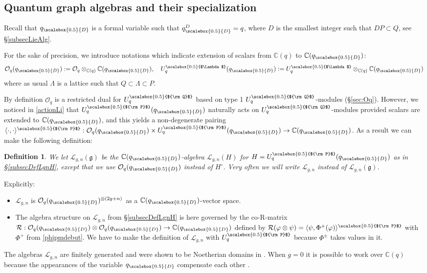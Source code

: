 \documentclass[11pt]{amsart}
\newtheorem{defi}[teo]{Definition}
\newcommand{\mc}{\mathbb{C}}
\newcommand{\Oo}{\mathcal{O}}
\newcommand{\qD}{q_{\scalebox{0.5}{D}}}
\newcommand{\Q}{{\scalebox{0.5}{${\rm Q}$}}}
\newcommand{\Pup}{{\scalebox{0.5}{${\rm P}$}}}
\newcommand{\Lam}{{\scalebox{0.5}{$\Lambda$}}}
\begin{document}
\subsection{Quantum graph algebras and their specialization}\label{subsecQuantumGraphAlg}
Recall that $\qD$ is a formal variable such that $\qD^D = q$, where $D$ is the smallest integer such that $DP \subset Q$, see \S\ref{subsecLieAlg}.

\indent For the sake of precision, we introduce notations which indicate extension of scalars from $\mathbb{C}(q)$ to $\mathbb{C}(\qD)$:
\[ \Oo_q(\qD) := \Oo_q \otimes_{\mc(q)} \mc(\qD), \quad U_q^\Lam(\qD) :=U_q^\Lam \otimes_{\mc(q)} \mc(\qD) \]
where as usual $\Lambda$ is a lattice such that $Q \subset \Lambda \subset P$.

\indent By definition $\mathcal{O}_q$ is a restricted dual for $U_q^\Q$ based on type 1 $U_q^\Q$-modules (\S\ref{sec:Oq}). However, we noticed in \eqref{actionLi} that $U_q^\Pup(\qD)$ naturally acts on $U_q^\Q$-modules provided scalars are extended to $\mathbb{C}(\qD)$, and this yields a non-degenerate pairing $\langle \cdot,\cdot\rangle^\Pup : \mathcal{O}_q(\qD) \times U^\Pup_q(\qD) \to \mathbb{C}(\qD)$. As a result we can make the following definition:

\begin{defi}
We let $\mathcal{L}_{g,n}(\mathfrak{g})$ be the $\mathbb{C}(\qD)$-algebra $\mathcal{L}_{g,n}(H)$ for $H = U_q^\Pup(\qD)$ as in \S\ref{subsecDefLgnH}, except that we use $\mathcal{O}_q(\qD)$ instead of $H^\circ$. Very often we will write $\mathcal{L}_{g,n}$ instead of $\mathcal{L}_{g,n}(\mathfrak{g})$.
\end{defi}
\noindent Explicitly:
\begin{itemize}
\item $\mathcal{L}_{g,n}$ is $\mathcal{O}_q(\qD)^{\otimes (2g+n)}$ as a $\mathbb{C}(\qD)$-vector space.
\item The algebra structure on $\mathcal{L}_{g,n}$ from \S\ref{subsecDefLgnH} is here governed by the co-R-matrix $\mathcal{R} : \mathcal{O}_q(\qD) \otimes \mathcal{O}_q(\qD) \to \mathbb{C}(\qD)$ defined by $\mathcal{R}(\varphi \otimes \psi) = \langle \psi, \Phi^+(\varphi) \rangle^\Pup$ with $\Phi^+$ from \eqref{phipmdebut}. We have to make the definition of $\mathcal{L}_{g,n}$ with $U_q^\Pup$ because $\Phi^\pm$ takes values in it.
\end{itemize}
 The algebras $\mathcal{L}_{g,n}$ are finitely generated and were shown to be Noetherian domains in \cite{BFR}. When $g=0$ it is possible to work over $\mathbb{C}(q)$ because the appearances of the variable $\qD$ compensate each other \cite[Prop.\,6.2]{BR1}.
\end{document}
